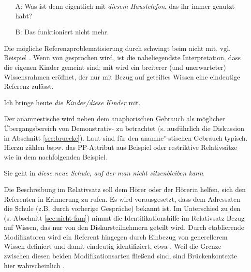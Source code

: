 \begin{exe}
	\ex \label{ex:auer} 
	\begin{itemize}
		\item[A:] Was ist denn eigentlich mit \textit{diesem Haustelefon}, das ihr immer genutzt habt? 
		\item[B:] Das funktioniert nicht mehr. 
	\end{itemize}
\end{exe}

Die mögliche Referenzproblematisierung durch  schwingt beim  nicht mit, vgl. Beispiel  \parencites()()[][80]{Bisle-Muller1991}[][70]{Himmelmann1997}. Wenn von  gesprochen wird, ist die naheliegendste Interpretation, dass die eigenen Kinder gemeint sind; mit  wird ein breiterer (und unerwarteter) Wissensrahmen eröffnet, der nur mit Bezug auf geteiltes Wissen eine eindeutige Referenz zulässt.    

\begin{exe}
	\ex \label{ex:kinder} Ich bringe heute \textit{die Kinder/diese Kinder} mit.   
\end{exe}

Der anamnestische  wird neben dem anaphorischen  Gebrauch als möglicher Übergangsbereich von Demonstrativ- zu  betrachtet (s. ausführlich die Diskussion in Abschnitt \ref{sec:bruecke}). Laut \textcite[73]{Himmelmann1997} sind für den anamne"-stischen Gebrauch  typisch. Hierzu zählen bspw. das PP-Attribut  aus Beispiel  oder restriktive Relativsätze wie in dem nachfolgenden Beispiel.

\begin{exe}
	\ex \label{ex:film} Sie geht in \textit{diese neue Schule, auf der man nicht sitzenbleiben kann}.    
\end{exe}
\noindent 
Die Beschreibung im Relativsatz soll dem Hörer oder der Hörerin helfen, sich den Referenten in Erinnerung zu rufen. Es wird vorausgesetzt, dass dem Adressaten die Schule (z.B. durch vorherige Gespräche) bekannt ist. Im Unterschied zu den  (s. Abschnitt \ref{sec:nicht-fam}) nimmt die Identifikationshilfe im Relativsatz Bezug auf Wissen, das nur von den Diskursteilnehmern geteilt wird. Durch etablierende Modifikatoren wird ein Referent hingegen durch Einbezug von generellerem Wissen definiert und damit eindeutig identifiziert, etwa . Weil die Grenze zwischen diesen beiden Modifikationsarten fließend sind, sind Brückenkontexte  hier wahrscheinlich \parencite[s. zur ausführlichen Diskussion][79--80]{Himmelmann1997}. 

